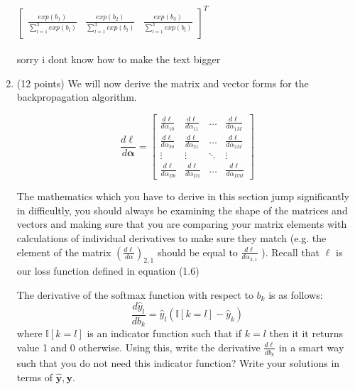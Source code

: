 \documentclass[11pt]{exam}
\numberwithin{equation}{section} %
\numberwithin{figure}{section} %
\numberwithin{table}{section} %
\newcommand{\adj}[1]{\frac{d \ell}{d #1}}
\newcommand{\Ib}{\mathbb{I}}
\newcommand{\yv}{\mathbf{y}}
\newcommand{\alphav     }{\boldsymbol \alpha     }
\begin{document}
\begin{enumerate}
\begin{questions}
	        \begin{tcolorbox}[fit,height=4cm, width=15cm, blank, borderline={1pt}{-2pt}]
	   $\begin{bmatrix}
		   \frac{exp(b_1)}{\sum_{l=1}^{3} exp(b_l)} & \frac{exp(b_2)}{\sum_{l=1}^{3} exp(b_l)} & \frac{exp(b_3)}{\sum_{l=1}^{3} exp(b_l)} 
		   
	    \end{bmatrix} ^T$ 
			\\ \\sorry i dont know how to make the text bigger
	        \end{tcolorbox}
	        
	        
	        
	    \end{questions} 
	
	\item (12 points) We will now derive the matrix and vector forms for the backpropagation algorithm.
	
	$$\frac{d\ell}{d\alphav} = 
	    \begin{bmatrix}
	        \adj{\alpha_{10}} & \adj{\alpha_{11}} & \dots  & \adj{\alpha_{1M}} \\
	        \adj{\alpha_{20}} & \adj{\alpha_{21}} & \dots  & \adj{\alpha_{2M}} \\
	        \vdots      & \vdots      & \ddots & \vdots \\
	        \adj{\alpha_{D0}} & \adj{\alpha_{D1}} & \dots  & \adj{\alpha_{DM}}
	    \end{bmatrix}$$
	
	
	
	
	The mathematics which you have to derive in this section jump significantly in difficultly, you should always be examining the shape of the matrices and vectors and making sure that you are comparing your matrix elements with calculations of individual derivatives to make sure they match (e.g. the element of the matrix $(\frac{d\ell}{d\alpha})_{2,1}$ should be equal to $\frac{d\ell}{d\alpha_{2,1}}$  ). Recall that $\ell$ is our loss function defined in equation (1.6)
	    
	    \begin{questions}
	        \question[3] The derivative of the softmax function with respect to $b_k$ is as follows:
	        $$\frac{d\hat{y}_l}{db_k} = \hat{y}_l(\Ib[k=l]-\hat{y}_k)$$ 
	        where $\Ib[k=l]$ is an indicator function such that if $k=l$ then it it returns value 1 and 0 otherwise. 
	        Using this, write the derivative $\frac{d\ell}{db_k}$ in a smart way such that you do not need this indicator function? Write your solutions in terms of $\hat{\yv},\yv$.
	        

\end{questions}
\end{enumerate}
\end{document}
